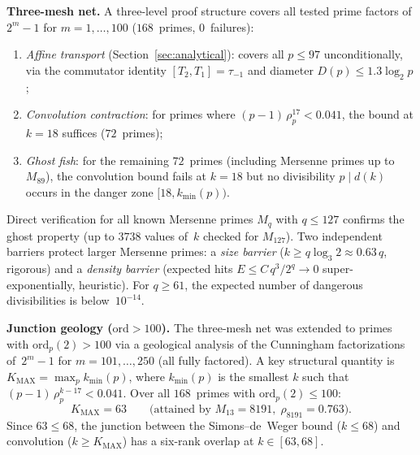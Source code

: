 \documentclass[12pt, a4paper]{amsart}
\theoremstyle{plain}
\theoremstyle{definition}
\theoremstyle{remark}
\newcommand{\ord}{\mathrm{ord}}
\begin{document}
\medskip\noindent
\textbf{Three-mesh net.}
A three-level proof structure covers all tested prime factors of
$2^m - 1$ for $m = 1, \ldots, 100$ ($168$~primes, $0$~failures):
\begin{enumerate}[label=(\roman*)]
  \item \emph{Affine transport} (Section~\ref{sec:analytical}):
    covers all $p \leq 97$ unconditionally, via the commutator
    identity $[T_2, T_1] = \tau_{-1}$ and diameter
    $D(p) \leq 1.3 \log_2 p$;
  \item \emph{Convolution contraction}: for primes where
    $(p-1)\,\rho_p^{17} < 0.041$, the bound at $k = 18$ suffices
    ($72$~primes);
  \item \emph{Ghost fish}: for the remaining $72$~primes (including
    Mersenne primes up to $M_{89}$), the convolution bound
    fails at $k = 18$ but no divisibility $p \mid d(k)$ occurs
    in the danger zone $[18, k_{\min}(p))$.
\end{enumerate}
Direct verification for all known Mersenne primes $M_q$ with
$q \leq 127$ confirms the ghost property (up to $3738$ values
of~$k$ checked for $M_{127}$). Two independent barriers protect
larger Mersenne primes: a \emph{size barrier}
($k \geq q \log_3 2 \approx 0.63\,q$, rigorous) and a
\emph{density barrier} (expected hits
$E \leq C\,q^3/2^q \to 0$ super-exponentially, heuristic).
For $q \geq 61$, the expected number of dangerous divisibilities
is below~$10^{-14}$.

\medskip\noindent
\textbf{Junction geology ($\ord > 100$).}
The three-mesh net was extended to primes with
$\ord_p(2) > 100$ via a geological analysis of the
Cunningham factorizations of~$2^m - 1$ for
$m = 101, \ldots, 250$ (all fully factored).
A key structural quantity is
$K_{\mathrm{MAX}} = \max_p k_{\min}(p)$, where
$k_{\min}(p)$ is the smallest $k$ such that
$(p-1)\,\rho_p^{k-17} < 0.041$.
Over all $168$~primes with $\ord_p(2) \leq 100$:
\begin{equation}\label{eq:kmax}
  K_{\mathrm{MAX}} = 63
  \qquad\text{(attained by } M_{13} = 8191,\;
  \rho_{8191} = 0.763\text{).}
\end{equation}
Since $63 \leq 68$, the junction between the Simons--de~Weger
bound ($k \leq 68$) and convolution ($k \geq K_{\mathrm{MAX}}$)
has a six-rank overlap at $k \in [63, 68]$.
\end{document}
